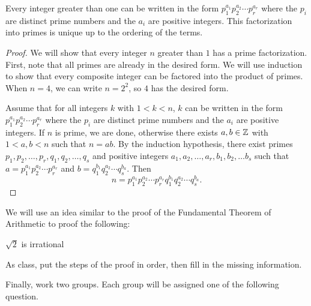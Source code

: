 \documentclass{../ximera}
\begin{document}


\begin{thm*}\label{FTA}
	Every integer greater than one can be written in the form $p_1^{a_1}p_2^{a_2}\cdots p_r^{a_r}$ where the $p_i$ are distinct prime numbers and the $a_i$ are positive integers. This factorization into primes is unique up to the ordering of the terms.

	\begin{proof}
 		We will show that every integer $n$ greater than $1$ has a prime factorization. First, note that all primes are already in the desired form. We will use induction to show that every composite integer can be factored into the product of primes. When $n=4$, we can write $n=2^2$, so $4$ has the desired form.
 
		Assume that for all integers $k$ with $1<k<n$, $k$ can be written in the form  $p_1^{a_1}p_2^{a_2}\cdots p_r^{a_r}$ where the $p_i$ are distinct prime numbers and the $a_i$ are positive integers. If $n$ is prime, we are done, otherwise there exists $a,b\in\mathbb Z$ with $1<a,b<n$ such that $n=ab$. By the induction hypothesis, there exist primes $p_1,p_2,\dots,p_r,q_1,q_2,\dots,q_s$ and positive integers $a_1,a_2,\dots,a_r,b_1,b_2,\dots b_s$ such that $a=p_1^{a_1}p_2^{a_2}\cdots p_r^{a_r}$ and $b=q_1^{b_1}q_2^{a_2}\cdots q_s^{b_a}$. Then \[n=p_1^{a_1}p_2^{a_2}\cdots p_r^{a_r}q_1^{b_1}q_2^{a_2}\cdots q_s^{b_a}.\]
	\end{proof}
\end{thm*}

We will use an idea similar to the proof of the Fundamental Theorem of Arithmetic to proof the following:

\begin{br}
	\begin{prop*}
		$\sqrt{2}$ is irrational
	\end{prop*}

	As class, put the steps of the proof in order, then fill in the missing information.
\end{br}

Finally, work two groups. Each group will be assigned one of the following question.
\end{document}
